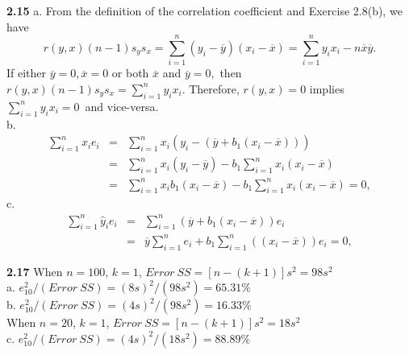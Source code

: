 \textbf{2.15} a. From the definition of the correlation coefficient
and Exercise 2.8(b), we have
\begin{equation*}
r(y,x)(n-1)s_y s_x = \sum_{i=1}^n \left( y_i-\overline{y}\right)
\left( x_i-\overline{x}\right) = \sum_{i=1}^n y_i x_i - n
\overline{x} \overline{y}.
\end{equation*}
If either $\overline{y}=0,\overline{x}=0$ or both $\overline{x}$
and $\overline{y}=0,$ then $r(y,x)(n-1)s_y s_x = \sum_{i=1}^n y_i
x_i $. Therefore, $r(y,x)=0$ implies
$\sum_{i=1}^ny_i x_i=0$\ and vice-versa.\\
b. \begin{eqnarray*} \sum_{i=1}^n x_i e_i &=& \sum_{i=1}^n x_i (y_i
- (\overline{y} + b_1(x_i-\overline{x}) )) \\ &=& \sum_{i=1}^n x_i
(y_i - \overline{y}) - b_1 \sum_{i=1}^n x_i (x_i-\overline{x}) \\
&=& \sum_{i=1}^n x_i b_1(x_i - \overline{x}) - b_1 \sum_{i=1}^n x_i
(x_i-\overline{x}) = 0,
\end{eqnarray*}
c.\begin{eqnarray*} \sum_{i=1}^n \widehat{y}_i e_i &=& \sum_{i=1}^n
(
\overline{y}+b_1(x_i-\overline{x})) e_i \\
&=&  \overline{y} \sum_{i=1}^n e_i + b_1\sum_{i=1}^n (
(x_i-\overline{x})) e_i = 0,
\end{eqnarray*}

\textbf{2.17}
When $n = 100$, $k = 1$, $Error~SS = [n-(k+1)]s^2 = 98s^2$\\
a. $e_{10}^2/(Error~SS) = (8s)^2/(98s^2) = 65.31\%$\\
b. $e_{10}^2/(Error~SS) = (4s)^2/(98s^2) = 16.33\%$\\
When $n = 20$, $k = 1$, $Error~SS = [n-(k+1)]s^2 = 18s^2$\\
c. $e_{10}^2/(Error~SS) = (4s)^2/(18s^2) = 88.89\%$\\

